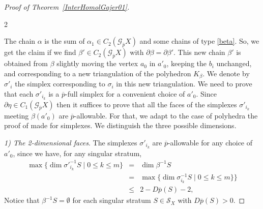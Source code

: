 \documentclass[a4paper,10pt,english,reqno]{amsart}
\theoremstyle{plain}
\theoremstyle{definition}
\theoremstyle{remark}
\numberwithin{equation}{section}
\newcommand{\thmref}[1]{Theorem~\ref{#1}}
\def\ov{\overline}
\def\cS{{\mathcal S}}
\def\crG{{\mathscr G}}
\renewcommand\1{\hbox{\ding{192}}}
\renewcommand\2{\hbox{\ding{193}}}
\newcommand\3{\hbox{\ding{194}}}
\newcommand\4{\hbox{\ding{195}}}
\begin{document}
\begin{proof}[Proof of \thmref{InterHomolGajer01}]
\begin{multicols}{2}
{
}
\end{multicols}

%
The chain $\alpha$ is the sum of $\alpha_1 \in C_2(\crG_{\ov p}X)$ and some chains of type
\eqref{beta}. So, we get the claim if we  find $\beta' \in C_2(\crG_{\ov p}X)$ with $\partial \beta = \partial \beta'$.
This new chain $\beta'$ is obtained from $\beta$ slightly moving the vertex $a_0$ in $a'_{0}$, keeping the $b_{i}$ unchanged, and corresponding to a new triangulation of 
the polyhedron $K_{\beta}$.
We denote by $\sigma'_{i}$ the simplex corresponding to $\sigma_{i}$ in this new triangulation. 
% 
We need to prove that each $\sigma'_{i_k}$ is a $\ov p$-full simplex for a convenient choice of $a'_0$. 
Since $\partial \eta \in C_1(\crG_{\ov p} X)$ then  it suffices to prove that all the faces of the simplexes $\sigma'_{i_k}$ meeting $\beta (a'_0)$ are $\ov p$-allowable.
For that, we adapt to the case of polyhedra the proof of \cite[Proposition 6]{CST8} made for simplexes.
We distinguish the three possible dimensions.

 \smallskip
 \emph{1) The 2-dimensional faces}. The simplexes $\sigma'_{i_k}$  are $\ov p$-allowable  for any choice of $a'_{0}$, since we have, for any singular stratum,
\begin{eqnarray*}
\max \{ \dim \sigma'^{-1}_{i_k}S \mid 0\leq k\leq  m \} &=&
\dim \beta^{-1}S \\
&=&  \max \{ \dim \sigma^{-1}_{i_k}S \mid 0\leq k\leq  m \} \}\\
&  \leq & 2 -D\ov p(S) -2,
\end{eqnarray*}
%
Notice that $\beta^{-1}S = \emptyset$ for each singular stratum $S \in \cS_X$ with $D\ov p(S)>0$.


\end{proof}
\end{document}
